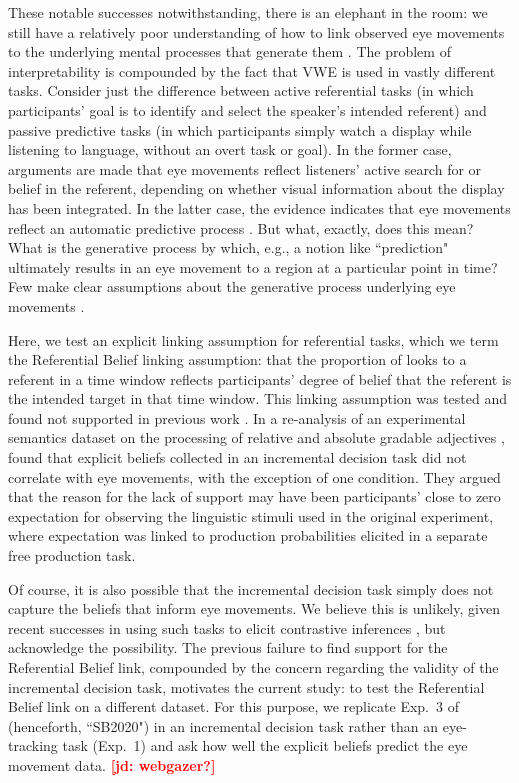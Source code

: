 \documentclass[10pt,letterpaper]{article}
\newcommand{\expref}[1]{Exp.~#1}
\newcommand{\jd}[1]{\textcolor{Red}{\textbf{[jd: #1]}}}
\begin{document}
These notable successes notwithstanding, there is an elephant in the room: we still have a relatively poor understanding of how to link observed eye movements to the underlying mental processes that generate them \cite{SalverdaTanenhaus2017:The-Visual-World-Paradigm, tanenhaus2000eye, Allopenna1998, magnuson2019fixations}. The problem of interpretability  is compounded by the fact that VWE is used in vastly different tasks. Consider just the difference between active referential tasks (in which participants' goal is to identify and select the speaker's intended referent) and passive predictive tasks (in which participants simply watch a display while listening to language, without an overt task or goal). In the former case, arguments are made that eye movements reflect listeners' active search for or belief in the referent, depending on whether visual information about the display has been integrated. In the latter case, the evidence indicates that eye movements reflect an automatic predictive process \cite{altmann1999}. But what, exactly, does this mean? What is the generative process by which, e.g., a notion like ``prediction" ultimately results in an eye movement to a region at a particular point in time? Few make clear assumptions about the generative process underlying eye movements \cite<but for a principled early example, see >{Allopenna1998}.

Here, we test an explicit linking assumption for referential tasks, which we term the Referential Belief linking assumption: that the proportion of looks to a referent in a time window reflects participants' degree of belief that the referent is the intended target in that time window. This linking assumption was tested and found not supported in previous work \cite{QingLD2018}. In a re-analysis of an experimental semantics dataset on the processing of relative and absolute gradable adjectives \cite{LeffelXiangKennedy2016:Imprecision-is-Pragmatic-},  found that explicit beliefs collected in an incremental decision task \cite<similar to gating tasks,>{Allopenna1998} did not correlate with eye movements, with the exception of one condition. They argued that the reason for the lack of support may have been participants' close to zero expectation  for observing the linguistic stimuli used in the original experiment, where expectation was linked to production probabilities elicited in a separate free production task.

Of course, it is also possible that the incremental decision task simply does not capture the beliefs that inform eye movements. We believe this is unlikely, given recent successes in using such tasks to elicit contrastive inferences \cite{KreissDegen2020, alsop2018}, but acknowledge the possibility. The previous failure to find support for the Referential Belief link, compounded by the concern regarding the validity of the incremental decision task, motivates the current study: to test the Referential Belief link on a different dataset. For this purpose, we replicate \expref{3} of  (henceforth, ``SB2020") in an incremental decision task rather than an eye-tracking task (\expref{1}) and ask how well the explicit beliefs predict the eye movement data. \jd{webgazer?}
\end{document}
